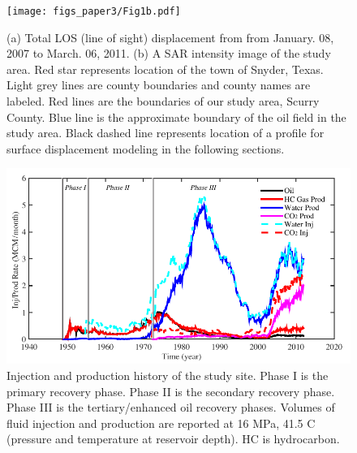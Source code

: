 \clearpage
\begin{figure}
\centering
\texttt{[image: figs\_paper3/Fig1b.pdf]}	
\caption[(a) Total LOS (line of sight) displacement from from January. 08, 2007 to March. 06, 2011. (b) A SAR intensity image of the study area.]{(a) Total LOS (line of sight) displacement from from January. 08, 2007 to March. 06, 2011. (b) A SAR intensity image of the study area.  Red star represents location of the town of Snyder, Texas.  Light grey lines are county boundaries and county names are labeled.  Red lines are the boundaries of our study area, Scurry County.  Blue line is the approximate boundary of the oil field in the study area.  Black dashed line represents location of a profile for surface displacement modeling in the following sections.}
\label{fig:chpt5_fig1b}
\end{figure}

\clearpage
\begin{figure}
	\centering
	\includegraphics{figs_paper3/Fig2.pdf}	
	\caption[Injection and production history of the study site.]{Injection and production history of the study site.  Phase I is the primary recovery phase.  Phase II is the secondary recovery phase.  Phase III is the tertiary/enhanced oil recovery phases.  Volumes of fluid injection and production are reported at 16 MPa, 41.5 \textordmasculine C (pressure and temperature at reservoir depth). HC is hydrocarbon.}
	\label{fig:chpt5_fig2}
\end{figure}

